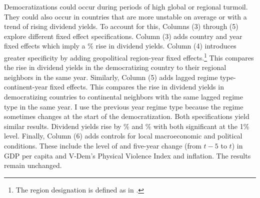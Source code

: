

Democratizations could occur during periods of high global or regional turmoil. They could also occur in countries that are more unstable on average or with a trend of rising dividend yields. To account for this, Columns (3) through (5) explore different fixed effect specifications.  Column (3) adds country and year fixed effects which imply a \tabOnecolThreePE\% rise in dividend yields. Column (4) introduces greater specificity by adding geopolitical region-year fixed effects.\footnote{The region designation is defined as in \cite{Teorell2018}.} This compares the rise in dividend yields in the democratizing country to their regional neighbors in the same year. Similarly, Column (5) adds lagged regime type-continent-year fixed effects. This compares the rise in dividend yields in democratizing countries to continental neighbors with the same lagged regime type in the same year.  I use the previous year regime type because the regime sometimes changes at the start of the democratization. Both specifications yield similar results. Dividend yields rise by \tabOnecolFourPE\% and \tabOnecolFivePE\% with both significant at the 1\% level. Finally, Column (6) adds controls for local macroeconomic and political conditions. These include the level of and five-year change (from $t-5$ to $t$) in GDP per capita and V-Dem's Physical Violence Index and inflation. The results remain unchanged.

